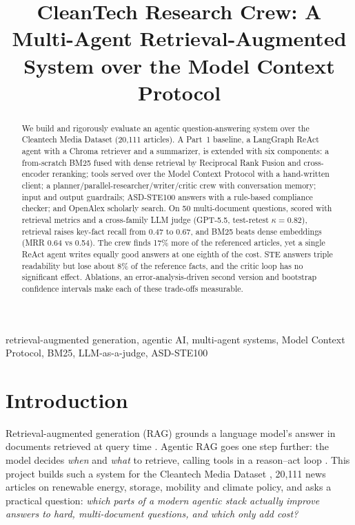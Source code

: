 \documentclass[conference]{IEEEtran}
\begin{document}
\title{CleanTech Research Crew: A Multi-Agent Retrieval-Augmented System over the Model Context Protocol}

\author{
}

\maketitle

\begin{abstract}
We build and rigorously evaluate an agentic question-answering system over the Cleantech Media Dataset
(20{,}111 articles). A Part~1 baseline, a LangGraph ReAct agent with a Chroma retriever and a summarizer, is
extended with six components: a from-scratch BM25 fused with dense retrieval by Reciprocal Rank Fusion and
cross-encoder reranking; tools served over the Model Context Protocol with a hand-written client; a
planner/parallel-researcher/writer/critic crew with conversation memory; input and output guardrails; ASD-STE100
answers with a rule-based compliance checker; and OpenAlex scholarly search. On 50 multi-document questions,
scored with retrieval metrics and a cross-family LLM judge (GPT-5.5, test-retest $\kappa=0.82$), retrieval
raises key-fact recall from 0.47 to 0.67, and BM25 beats dense embeddings (MRR 0.64 vs 0.54). The crew finds
17\% more of the referenced articles, yet a single ReAct agent writes equally good answers at one eighth of the
cost. STE answers triple readability but lose about 8\% of the reference facts, and the critic loop has no
significant effect. Ablations, an error-analysis-driven second version and bootstrap confidence intervals
make each of these trade-offs measurable.
\end{abstract}

\begin{IEEEkeywords}
retrieval-augmented generation, agentic AI, multi-agent systems, Model Context Protocol, BM25, LLM-as-a-judge, ASD-STE100
\end{IEEEkeywords}

\section{Introduction}
Retrieval-augmented generation (RAG) grounds a language model's answer in documents retrieved at query time
\cite{lewis2020rag}. Agentic RAG goes one step further: the model decides \emph{when} and \emph{what} to
retrieve, calling tools in a reason--act loop \cite{yao2023react}. This project builds such a system for the
Cleantech Media Dataset \cite{lipenkova2024cleantech}, 20{,}111 news articles on renewable energy,
storage, mobility and climate policy, and asks a practical question: \emph{which parts of a modern agentic
stack actually improve answers to hard, multi-document questions, and which only add cost?}
\end{document}
